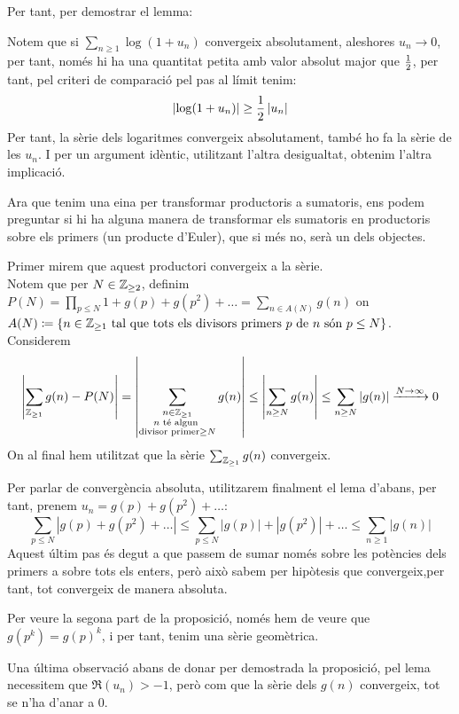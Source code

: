 Per tant, per demostrar el lemma:
\begin{pf}
    Notem que si $\sum_{n\geq 1}\log(1+u_n)$ convergeix absolutament, aleshores $u_n\rightarrow0$, per tant, només hi ha una quantitat petita amb valor absolut major que $\frac{1}{2}$, per tant, pel criteri de comparació pel pas al límit tenim:
    \[
    \left|\log(1+u_n)\right|\geq\frac{1}{2}\left|u_n\right|
    \]
    Per tant, la sèrie dels logaritmes convergeix absolutament, també ho fa la sèrie de les $u_n$. I per un argument idèntic, utilitzant l'altra desigualtat, obtenim l'altra implicació.
\end{pf}
Ara que tenim una eina per transformar productoris a sumatoris, ens podem preguntar si hi ha alguna manera de transformar els sumatoris en productoris sobre els
primers (un producte d'Euler), que si més no, serà un dels objectes.
\begin{pf}
    Primer mirem que aquest productori convergeix a la sèrie.\\
    Notem que per $N\in\mathbb Z_{\geq 2}$, definim $P(N)=\prod_{p\leq N}1+g(p)+g(p^2)+\dots=\sum_{n\in A(N)}g(n)$ on $A(N)\coloneq\{n\in{\mathbb Z_{\geq1}}\text{ tal que tots els divisors primers }p\text{ de }n\text{ són }p\leq N\}$. Considerem
    \[
    \left|\sum_{{\mathbb Z_{\geq1}}}g(n)-P(N)\right|=
    \left|\sum_{\substack{n\in{\mathbb Z_{\geq1}}\\n\text{ té algun }\\\text{divisor primer}\geq N}}g(n)\right|\leq
    \left|\sum_{n\geq N}g(n)\right|\leq
    \sum_{n\geq N}|g(n)|\xrightarrow{N\rightarrow\infty}0 
    \]
    On al final hem utilitzat que la sèrie $\sum_{\mathbb Z_{\geq1}} g(n)$ convergeix.\par
    Per parlar de convergència absoluta, utilitzarem finalment el lema d'abans, per tant, prenem $u_n=g(p)+g(p^2)+\dots$:
    \[\sum_{p\leq N}\left|g(p)+g(p^2)+\dots\right|\leq\sum_{p\leq N}|g(p)|+|g(p^2)|+\dots\leq\sum_{n\geq 1}|g(n)|\]
    Aquest últim pas és degut a que passem de sumar només sobre les potències dels primers a sobre tots els enters, però això sabem per hipòtesis que convergeix,per tant, tot convergeix de manera absoluta.\par
    Per veure la segona part de la proposició, només hem de veure que $g(p^k)=g(p)^k$, i per tant, tenim una sèrie geomètrica.\par
    Una última observació abans de donar per demostrada la proposició, pel lema necessitem que $\Re(u_n)>-1$, però com que la sèrie dels $g(n)$ convergeix, tot se n'ha d'anar a 0.
\end{pf}
